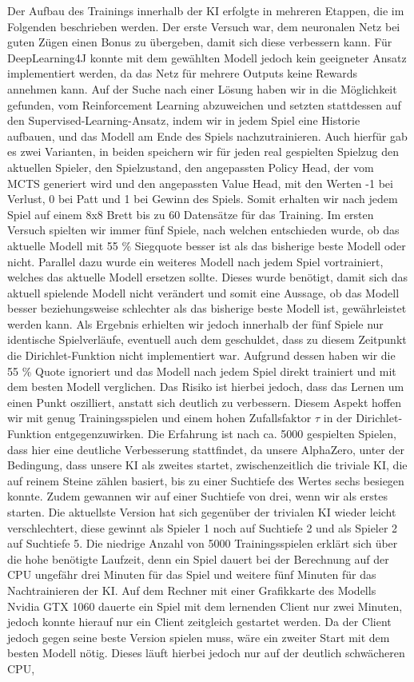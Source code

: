 \documentclass[12pt,a4paper]{article}
\begin{document}
Der Aufbau des Trainings innerhalb der KI erfolgte in mehreren Etappen, die im Folgenden beschrieben werden. Der erste Versuch war, dem neuronalen Netz bei guten Zügen einen Bonus zu übergeben, damit sich diese verbessern kann. Für DeepLearning4J konnte mit dem gewählten Modell jedoch kein geeigneter Ansatz implementiert werden, da das Netz für mehrere Outputs keine Rewards annehmen kann. Auf der Suche nach einer Lösung haben wir in \cite{Silver2017} die Möglichkeit gefunden, vom Reinforcement Learning abzuweichen und setzten stattdessen auf den Supervised-Learning-Ansatz, indem wir in jedem Spiel eine Historie aufbauen, und das Modell am Ende des Spiels nachzutrainieren. Auch hierfür gab es zwei Varianten, in beiden speichern wir für jeden real gespielten Spielzug den aktuellen Spieler, den Spielzustand, den angepassten Policy Head, der vom MCTS generiert wird und den angepassten Value Head, mit den Werten -1 bei Verlust, 0 bei Patt und 1 bei Gewinn des Spiels. Somit erhalten wir nach jedem Spiel auf einem 8x8 Brett bis zu 60 Datensätze für das Training. Im ersten Versuch spielten wir immer fünf Spiele, nach welchen entschieden wurde, ob das aktuelle Modell mit 55 \% Siegquote besser ist als das bisherige beste Modell oder nicht. Parallel dazu wurde ein weiteres Modell nach jedem Spiel vortrainiert, welches das aktuelle Modell ersetzen sollte. Dieses wurde benötigt, damit sich das aktuell spielende Modell nicht verändert und somit eine Aussage, ob das Modell besser beziehungsweise schlechter als das bisherige beste Modell ist, gewährleistet werden kann. Als Ergebnis erhielten wir jedoch innerhalb der fünf Spiele nur identische Spielverläufe, eventuell auch dem geschuldet, dass zu diesem Zeitpunkt die Dirichlet-Funktion nicht implementiert war. Aufgrund dessen haben wir die 55 \% Quote ignoriert und das Modell nach jedem Spiel direkt trainiert und mit dem besten Modell verglichen. Das Risiko ist hierbei jedoch, dass das Lernen um einen Punkt oszilliert, anstatt sich deutlich zu verbessern. Diesem Aspekt hoffen wir mit genug Trainingsspielen und einem hohen Zufallsfaktor $\tau$ in der Dirichlet-Funktion entgegenzuwirken. Die Erfahrung ist nach ca. 5000 gespielten Spielen, dass hier eine deutliche Verbesserung stattfindet, da unsere AlphaZero, unter der Bedingung, dass unsere KI als zweites startet, zwischenzeitlich die triviale KI, die auf reinem Steine zählen basiert, bis zu einer Suchtiefe des Wertes sechs besiegen konnte. Zudem gewannen wir auf einer Suchtiefe von drei, wenn wir als erstes starten. Die aktuellste Version hat sich gegenüber der trivialen KI wieder leicht verschlechtert, diese gewinnt als Spieler 1 noch auf Suchtiefe 2 und als Spieler 2 auf Suchtiefe 5. Die niedrige Anzahl von 5000 Trainingsspielen erklärt sich über die hohe benötigte Laufzeit, denn ein Spiel dauert bei der Berechnung auf der CPU ungefähr drei Minuten für das Spiel und weitere fünf Minuten für das Nachtrainieren der KI. Auf dem Rechner mit einer Grafikkarte des Modells Nvidia GTX 1060 dauerte ein Spiel mit dem lernenden Client nur zwei Minuten, jedoch konnte hierauf nur ein Client zeitgleich gestartet werden. Da der Client jedoch gegen seine beste Version spielen muss, wäre ein zweiter Start mit dem besten Modell nötig. Dieses läuft hierbei jedoch nur auf der deutlich schwächeren CPU, 
\end{document}
